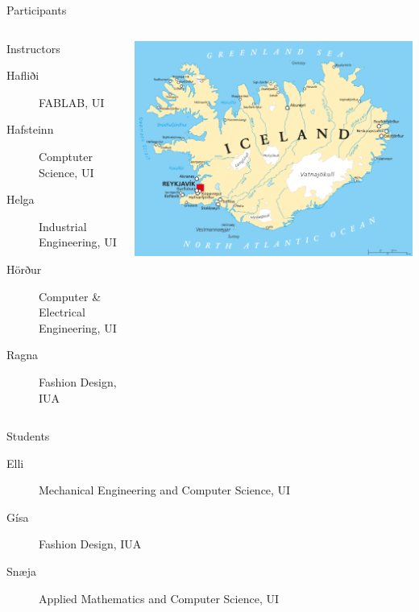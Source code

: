\documentclass[
    NAME={Dr. Helga Ingimundardóttir},
    EMAIL={helgaingim@hi.is},
    FACULTY={Industrial Engineering},
    TITLE={HiDef Textiles: Reviving Tradition with Innovation},
    SUBTITLE={Empowering Creativity and Sustainability in Textile Production through Digital Transformation},
    SEMINAR={Reykjavík DataBeers},
    DATE={January 25, 2025},
    WIDE={true}
]{HI-LaTeX/hi-beamer}
\begin{document}
\begin{frame}[allowframebreaks]{Participants}
\begin{columns}
    \begin{column}{0.6\linewidth}
    \begin{block}{Instructors}
    \begin{description}
        \item[Hafliði] FABLAB, UI
        \item[Hafsteinn] Comptuter Science, UI
        \item[Helga] Industrial Engineering, UI
        \item[Hörður] Computer \& Electrical Engineering, UI
        \item[Ragna] Fashion Design, IUA
    \end{description}
    \end{block}            
    \end{column}
    \begin{column}{.4\linewidth}
    \href{https://www.google.com/maps/@64.598672,-21.482637,7z/data=!4m2!6m1!1s1UOWfjkLtWahAwaLaiz39-9yktUtjgQ0?entry=ttu}{
    \includegraphics[width=\linewidth]{include/Iceland.jpg}}
    \end{column}
\end{columns}

\framebreak

\begin{block}{Students}
\begin{description}
\item[Elli] Mechanical Engineering and Computer Science, UI
\item[Gísa] Fashion Design, IUA
\item[Snæja] Applied Mathematics and Computer Science, UI
\end{description}
\end{block}


\end{frame}
\end{document}
